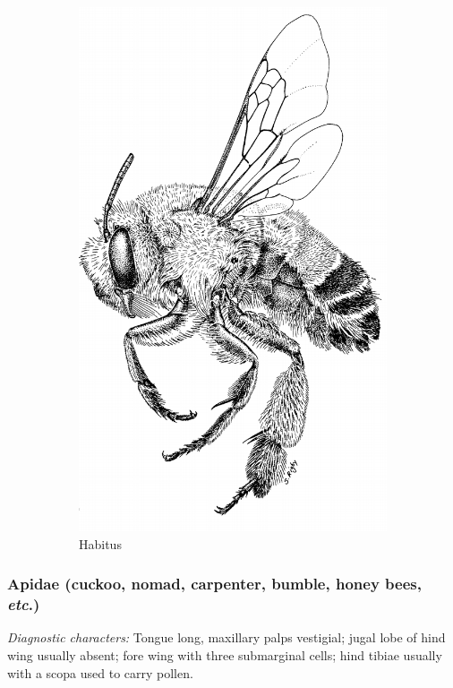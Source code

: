 \documentclass[letterpaper, 11pt]{article}
\begin{document}
\begin{figure}[ht!]
\begin{subfigure}[ht!]{0.3\textwidth}
        \includegraphics[width=\textwidth]{ApidHabitus}
        \caption{Habitus \citep[][Fig. 123]{goulet1993hymenoptera}}
        \label{fig:apid1}
    \end{subfigure}
    \caption{}\label{fig:notused}
\end{figure}

\subsubsection{Apidae (cuckoo, nomad, carpenter, bumble, honey bees, \textit{etc}.)}
\noindent{}\textit{Diagnostic characters:} Tongue long, maxillary palps vestigial; jugal lobe of hind wing usually absent; fore wing with three submarginal cells; hind tibiae usually with a scopa used to carry pollen.\\
\end{document}
